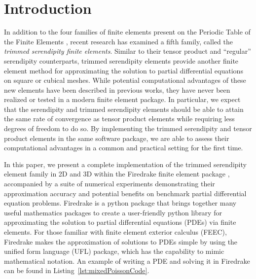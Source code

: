 \documentclass[manuscript,screen]{acmart}
\begin{document}
  
  \section{Introduction}
  
  In addition to the four families of finite elements present on the Periodic Table of the Finite Elements \cite{arnold2014periodic}, recent research has examined a fifth family, called the \emph{trimmed serendipity finite elements}.  Similar to their tensor product and ``regular'' serendipity counterparts,  trimmed serendipity elements provide another finite element method for approximating the solution to partial differential equations on square or cubical meshes.  While potential computational advantages of these new elements have been described in previous works, they have never been realized or tested in a modern finite element package.  In particular, we expect that the serendipity and trimmed serendipity elements should be able to attain the same rate of convergence as tensor product elements while requiring less degrees of freedom to do so.  By implementing the trimmed serendipity and tensor product elements in the same software package, we are able to assess their computational advantages in a common and practical setting for the first time.
  
  
  In this paper, we present a complete implementation of the trimmed serendipity element family in 2D and 3D within the Firedrake finite element package \cite{rathgeber2016firedrake}, accompanied by a suite of numerical experiments demonstrating their approximation accuracy and potential benefits on benchmark partial differential equation problems.
Firedrake is a python package that brings together many useful mathematics packages to create a user-friendly python library for approximating the solution to partial differential equations (PDEs) via finite elements.  For those familiar with finite element exterior calculus (FEEC), Firedrake makes the approximation of solutions to PDEs simple by using the unified form language (UFL) package, which has the capability to mimic mathematical notation.  An example of writing a PDE and solving it in Firedrake can be found in Listing~\ref{lst:mixedPoissonCode}.  
  
\end{document}
